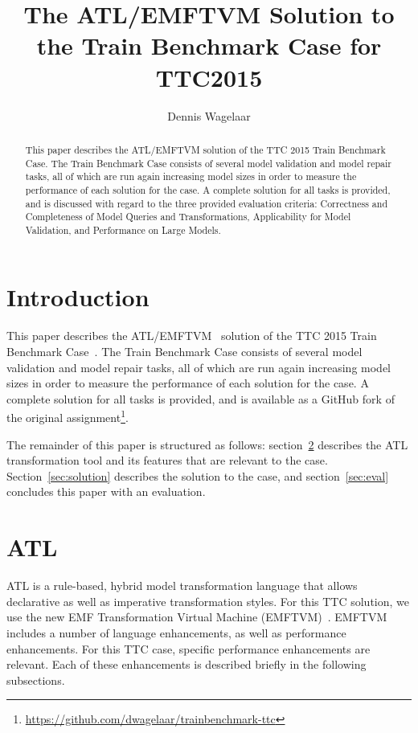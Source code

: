 \documentclass[submission,copyright,creativecommons]{eptcs}
\title{The {ATL/EMFTVM} Solution to the Train Benchmark Case for {TTC2015}}
\author{Dennis Wagelaar
\institute{HealthConnect\\
Vilvoorde, Belgium}
\email{dennis.wagelaar@healthconnect.be}
}
\begin{document}
\maketitle

\begin{abstract}
This paper describes the ATL/EMFTVM solution of the TTC 2015 Train Benchmark Case. The Train Benchmark Case consists of several model validation and model repair tasks, all of which are run again increasing model sizes in order to measure the performance of each solution for the case. A complete solution for all tasks is provided, and is discussed with regard to the three provided evaluation criteria: Correctness and Completeness of Model Queries and Transformations, Applicability for Model Validation, and Performance on Large Models.
\end{abstract}

\section{Introduction}
\label{sec:intro}

This paper describes the ATL/EMFTVM~\cite{journal/scp/Jouault2008} solution of the TTC 2015 Train Benchmark Case~\cite{conf/ttc/Szarnyas2015}. The Train Benchmark Case consists of several model validation and model repair tasks, all of which are run again increasing model sizes in order to measure the performance of each solution for the case. A complete solution for all tasks is provided, and is available as a GitHub fork of the original assignment\footnote{\url{https://github.com/dwagelaar/trainbenchmark-ttc}}.

The remainder of this paper is structured as follows: section~\ref{sec:atl} describes the ATL transformation tool and its features that are relevant to the case. Section~\ref{sec:solution} describes the solution to the case, and section~\ref{sec:eval} concludes this paper with an evaluation.

\section{ATL}
\label{sec:atl} 

ATL is a rule-based, hybrid model transformation language that allows declarative as well as imperative transformation styles. For this TTC solution, we use the new EMF Transformation Virtual Machine (EMFTVM)~\cite{conf/models/Wagelaar2011}. EMFTVM includes a number of language enhancements, as well as performance enhancements. For this TTC case, specific performance enhancements are relevant. Each of these enhancements is described briefly in the following subsections.
\end{document}
